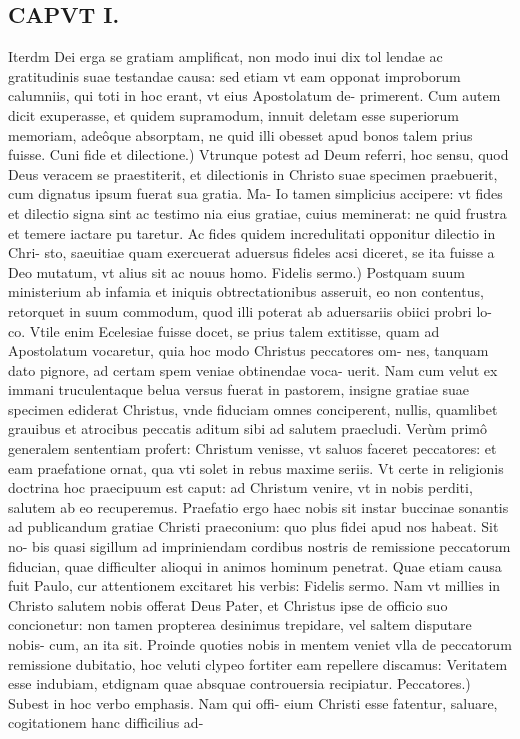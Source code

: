 \documentclass{article}
\begin{document}
\begin{pages}
\section*{CAPVT I. }
\marginpar{[ p.11 ]}\pstart Iterdm Dei erga se gratiam amplificat, non modo inui dix tol lendae ac gratitudinis suae testandae causa: sed etiam vt eam opponat improborum calumniis, qui toti in hoc erant, vt eius Apostolatum de- primerent. Cum autem dicit exuperasse, et quidem supramodum, innuit deletam esse superiorum memoriam, adeôque absorptam, ne quid illi obesset apud bonos talem prius fuisse.  \pend\pstart Cuni fide et dilectione.) Vtrunque potest ad Deum referri, hoc sensu, quod Deus veracem se praestiterit, et dilectionis in Christo suae specimen praebuerit, cum dignatus ipsum fuerat sua gratia. Ma- Io tamen simplicius accipere: vt fides et dilectio signa sint ac testimo nia eius gratiae, cuius meminerat: ne quid frustra et temere iactare pu taretur. Ac fides quidem incredulitati opponitur dilectio in Chri- sto, saeuitiae quam exercuerat aduersus fideles acsi diceret, se ita fuisse a Deo mutatum, vt alius sit ac nouus homo.  \pend\pstart Fidelis sermo.) Postquam suum ministerium ab infamia et iniquis obtrectationibus asseruit, eo non contentus, retorquet in suum commodum, quod illi poterat ab aduersariis obiici probri lo- co. Vtile enim Ecelesiae fuisse docet, se prius talem extitisse, quam ad Apostolatum vocaretur, quia hoc modo Christus peccatores om- nes, tanquam dato pignore, ad certam spem veniae obtinendae voca- uerit. Nam cum velut ex immani truculentaque belua versus fuerat in pastorem, insigne gratiae suae specimen ediderat Christus, vnde fiduciam omnes conciperent, nullis, quamlibet grauibus et atrocibus peccatis aditum sibi ad salutem praecludi. Verùm primô generalem sententiam profert: Christum venisse, vt saluos faceret peccatores: et eam praefatione ornat, qua vti solet in rebus maxime seriis. Vt certe in religionis doctrina hoc praecipuum est caput: ad Christum venire, vt in nobis perditi, salutem ab eo recuperemus. Praefatio ergo haec nobis sit instar buccinae sonantis ad publicandum gratiae Christi praeconium: quo plus fidei apud nos habeat. Sit no- bis quasi sigillum ad impriniendam cordibus nostris de remissione peccatorum fiducian, quae difficulter alioqui in animos hominum penetrat. Quae etiam causa fuit Paulo, cur attentionem excitaret his verbis: Fidelis sermo. Nam vt millies in Christo salutem nobis offerat Deus Pater, et Christus ipse de officio suo concionetur: non tamen propterea desinimus trepidare, vel saltem disputare nobis- cum, an ita sit. Proinde quoties nobis in mentem veniet vlla de peccatorum remissione dubitatio, hoc veluti clypeo fortiter eam repellere discamus: Veritatem esse indubiam, etdignam quae absquae controuersia recipiatur.  \pend\pstart Peccatores.) Subest in hoc verbo emphasis. Nam qui offi- eium Christi esse fatentur, saluare, cogitationem hanc difficilius ad-  \pend

\end{pages}
\end{document}
